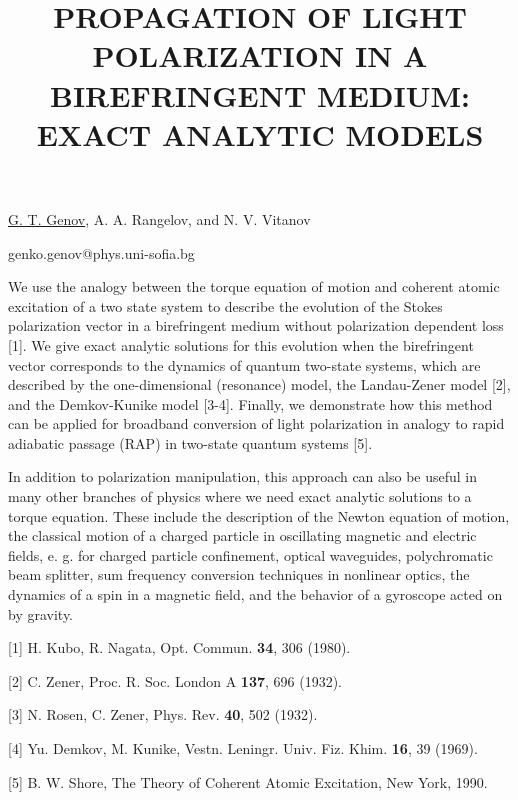 \title{PROPAGATION OF LIGHT POLARIZATION IN A BIREFRINGENT MEDIUM: EXACT ANALYTIC MODELS}

\underline{G. T. Genov}, A. A. Rangelov, and N. V. Vitanov
  

{\normalsize{
\vspace{-4mm} \unisofia

\email genko.genov@phys.uni-sofia.bg}}

We use the analogy between the torque equation of motion and coherent atomic excitation of a two state system to describe the evolution of the Stokes polarization vector in a birefringent medium without polarization dependent loss [1]. We give exact analytic solutions for this evolution when the birefringent vector corresponds to the dynamics of quantum two-state systems, which are described by the one-dimensional (resonance) model, the Landau-Zener model [2], and the Demkov-Kunike model [3-4]. Finally, we demonstrate how this method can be applied for broadband conversion of light polarization in analogy to rapid adiabatic passage (RAP) in two-state quantum systems [5].

In addition to polarization manipulation, this approach can also be useful in many other branches of physics where we need exact analytic solutions to a torque equation. These include the description of the Newton equation of motion, the classical motion of a charged particle in oscillating magnetic and electric fields, e. g. for charged particle confinement, optical waveguides, polychromatic beam splitter, sum frequency conversion techniques in nonlinear optics, the dynamics of a spin in a magnetic field, and the behavior of a gyroscope acted on by gravity.


{\normalsize
[1] H. Kubo, R. Nagata, Opt. Commun. \textbf{34}, 306 (1980).
\vsp

[2] C. Zener, Proc. R. Soc. London A \textbf{137}, 696 (1932).
\vsp

[3] N. Rosen, C. Zener, Phys. Rev. \textbf{40}, 502 (1932).
\vsp

[4] Yu. Demkov, M. Kunike, Vestn. Leningr. Univ. Fiz. Khim. \textbf{16}, 39 (1969).
\vsp

[5] B. W. Shore, The Theory of Coherent Atomic Excitation, New York, 1990.
}

\vspace{\baselineskip} 